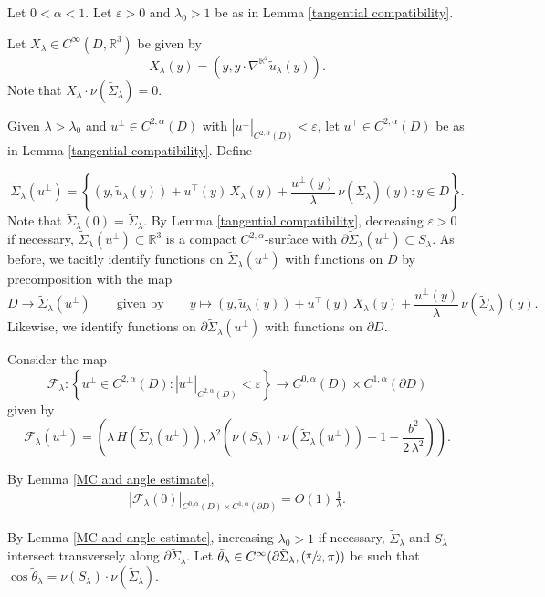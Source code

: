 \documentclass[11pt]{amsart}
\begin{document}
Let $0<\alpha<1$. Let $\varepsilon>0$ and $\lambda_0>1$ be as in Lemma \ref{tangential compatibility}. 

 Let $X_\lambda \in C^\infty(D,\mathbb{R}^3)$ be given by $$X_\lambda(y)=(y,y\cdot \nabla^{\mathbb{R}^2}\tilde u_\lambda(y)).$$
Note that $X_\lambda\cdot \nu(\tilde \Sigma_\lambda)=0$.

 Given $\lambda>\lambda_0$ and $u^\perp\in C^{2,\alpha}(D)$ with $|u^\perp|_{C^{2,\alpha}(D)}<\varepsilon$, let $u^\top \in C^{2,\alpha}(D)$ be as in Lemma \ref{tangential compatibility}. Define
 
$$
\tilde \Sigma_{\lambda}(u^\perp)=\left\{(y,\tilde u_\lambda(y))+u^\top(y)\,X_\lambda(y)+\frac{u^\perp(y)}{\lambda}\,\nu(\tilde \Sigma_{\lambda})(y):y\in D\right\}.
$$
Note that $\tilde \Sigma_\lambda(0)=\tilde \Sigma_\lambda$. By Lemma \ref{tangential compatibility}, decreasing $\varepsilon>0$ if necessary,  $\tilde \Sigma_{\lambda}(u^\perp)\subset \mathbb{R}^3$ is a compact $C^{2,\alpha}$-surface with $\partial \tilde \Sigma_{\lambda}(u^\perp)\subset S_\lambda$. As before, we tacitly identify functions  on $\tilde \Sigma_\lambda(u^\perp)$ with  functions on $D$ by precomposition with the map
$$
D\to \tilde \Sigma_\lambda(u^\perp)\qquad\text{given by}\qquad y\mapsto (y,\tilde u_\lambda(y))+u^\top(y)\,X_\lambda(y)+\frac{u^\perp(y)}{\lambda}\,\nu(\tilde \Sigma_{\lambda})(y).
$$
 Likewise, we identify functions on $\partial \tilde \Sigma_\lambda(u^\perp)$ with functions on $\partial D$. 

Consider the map
$$
\mathcal{F}_\lambda:\left\{u^\perp\in C^{2,\alpha}(D):|u^\perp|_{C^{2,\alpha}(D)}<\varepsilon\right\}\to C^{0,\alpha}(D)\times  C^{1,\alpha}(\partial D)
$$
 given by 
$$
\mathcal{F}_\lambda(u^\perp)=\left(\lambda\,H(\tilde \Sigma_\lambda(u^\perp)),\lambda^2\left(\nu(S_\lambda)\cdot \nu(\tilde \Sigma_\lambda(u^\perp))+1-\frac{b^2}{2\,\lambda^2}\right)\right).
$$

By Lemma \ref{MC and angle estimate},  
\begin{align} \label{almost solution} 
|\mathcal{F}_{\lambda}(0)|_{C^{0,\alpha}(D)\times  C^{1,\alpha}(\partial D)}=O(1)\,\frac{1}{\lambda}.
\end{align} 

By Lemma \ref{MC and angle estimate}, increasing $\lambda_0>1$ if necessary, $\tilde \Sigma_\lambda$ and $S_\lambda$ intersect transversely along $\partial \tilde \Sigma_\lambda$. Let $\tilde \theta_{\lambda}\in C^\infty(\partial \tilde \Sigma_\lambda ,(\sfrac{\pi}2,\pi))$ be  such that $\cos\tilde \theta_{\lambda}=\nu(S_\lambda)\cdot \nu(\tilde \Sigma_{\lambda})$. 
\end{document}
